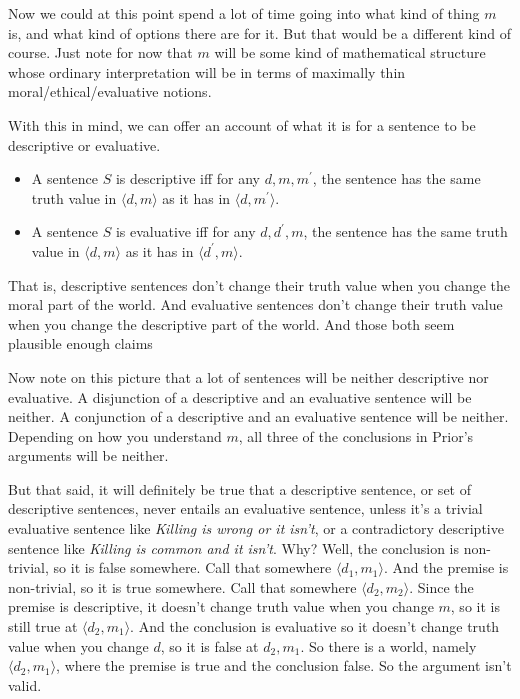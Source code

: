 \documentclass[
]{article}
\providecommand{\tightlist}{%
  \setlength{\itemsep}{0pt}\setlength{\parskip}{0pt}}
\begin{document}
Now we could at this point spend a lot of time going into what kind of
thing \(m\) is, and what kind of options there are for it. But that
would be a different kind of course. Just note for now that \(m\) will
be some kind of mathematical structure whose ordinary interpretation
will be in terms of maximally thin moral/ethical/evaluative notions.

With this in mind, we can offer an account of what it is for a sentence
to be descriptive or evaluative.

\begin{itemize}
\tightlist
\item
  A sentence \(S\) is descriptive iff for any \(d, m, m^\prime\), the
  sentence has the same truth value in \(\langle d, m \rangle\) as it
  has in \(\langle d, m^\prime \rangle\).
\item
  A sentence \(S\) is evaluative iff for any \(d, d^\prime, m\), the
  sentence has the same truth value in \(\langle d, m \rangle\) as it
  has in \(\langle d^\prime, m \rangle\).
\end{itemize}

That is, descriptive sentences don't change their truth value when you
change the moral part of the world. And evaluative sentences don't
change their truth value when you change the descriptive part of the
world. And those both seem plausible enough claims

Now note on this picture that a lot of sentences will be neither
descriptive nor evaluative. A disjunction of a descriptive and an
evaluative sentence will be neither. A conjunction of a descriptive and
an evaluative sentence will be neither. Depending on how you understand
\(m\), all three of the conclusions in Prior's arguments will be
neither.

But that said, it will definitely be true that a descriptive sentence,
or set of descriptive sentences, never entails an evaluative sentence,
unless it's a trivial evaluative sentence like \emph{Killing is wrong or
it isn't}, or a contradictory descriptive sentence like \emph{Killing is
common and it isn't}. Why? Well, the conclusion is non-trivial, so it is
false somewhere. Call that somewhere \(\langle d_1, m_1 \rangle\). And
the premise is non-trivial, so it is true somewhere. Call that somewhere
\(\langle d_2, m_2 \rangle\). Since the premise is descriptive, it
doesn't change truth value when you change \(m\), so it is still true at
\(\langle d_2, m_1 \rangle\). And the conclusion is evaluative so it
doesn't change truth value when you change \(d\), so it is false at
\(d_2, m_1\). So there is a world, namely \(\langle d_2, m_1 \rangle\),
where the premise is true and the conclusion false. So the argument
isn't valid.
\end{document}

